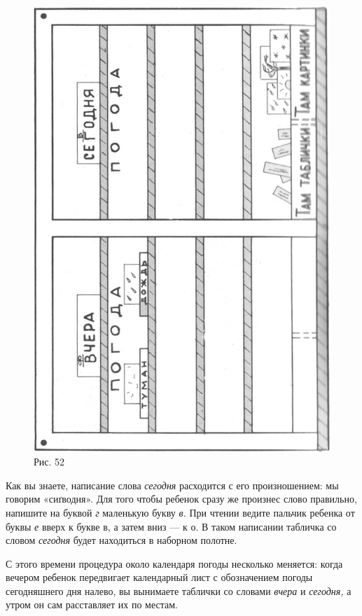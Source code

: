 \documentclass{book}
\renewcommand{\emph}[1]{\textit{#1}}
\begin{document}
\begin{figure}
\centering
\includegraphics[width=0.9\linewidth]{media/media/image48.png}
\caption*{Рис. 52}
\end{figure}


Как вы знаете, написание слова \emph{сегодня} расходится с его
произношением: мы говорим «сиґводня». Для того чтобы ребенок сразу же
произнес слово правильно, напишите на буквой \emph{г} маленькую букву
\emph{в.} При чтении ведите пальчик ребенка от буквы \emph{е} вверх к
букве в, а затем вниз --- к о. В таком написании табличка со словом
\emph{сегодня} будет находиться в наборном полотне.

С этого времени процедура около календаря погоды несколько меняется:
когда вечером ребенок передвигает календарный лист с обозначением погоды
сегодняшнего дня налево, вы вынимаете таблички со словами \emph{вчера} и
\emph{сегодня,} а утром он сам расставляет их по местам.
\end{document}
